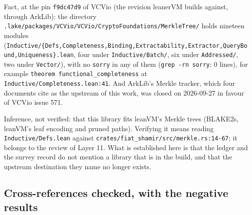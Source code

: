 \begin{sloppypar}
Fact, at the pin \texttt{f9dc47d9} of VCVio (the revision leanerVM builds against, through ArkLib): the directory \texttt{.\allowbreak{}lake/\allowbreak{}packages/\allowbreak{}VCVio/\allowbreak{}VCVio/\allowbreak{}Crypto\allowbreak{}Foundations/\allowbreak{}Merkle\allowbreak{}Tree/\allowbreak{}} holds nineteen modules (\texttt{Inductive/\allowbreak{}\{\allowbreak{}Defs,\allowbreak{}Completeness,\allowbreak{}Binding,\allowbreak{}Extractability,\allowbreak{}Extractor,\allowbreak{}Query\allowbreak{}Bound,\allowbreak{}Uniqueness\}.\allowbreak{}lean}, four under \texttt{Inductive/\allowbreak{}Batch/\allowbreak{}}, six under \texttt{Addressed/\allowbreak{}}, two under \texttt{Vector/\allowbreak{}}), with no \texttt{sorry} in any of them (\texttt{grep -\allowbreak{}rn sorry}: 0 lines), for example \texttt{theorem functional\_\allowbreak{}completeness} at \texttt{Inductive/\allowbreak{}Completeness.\allowbreak{}lean:\allowbreak{}41}. And ArkLib's Merkle tracker, which four documents cite as the upstream of this work, was closed on 2026-09-27 in favour of VCVio issue 571.
\end{sloppypar}

\begin{sloppypar}
Inference, not verified: that this library fits leanVM's Merkle trees (BLAKE2s, leanVM's leaf encoding and pruned paths). Verifying it means reading \texttt{Inductive/\allowbreak{}Defs.\allowbreak{}lean} against \texttt{crates/\allowbreak{}fiat\_\allowbreak{}shamir/\allowbreak{}src/\allowbreak{}merkle.\allowbreak{}rs:\allowbreak{}14-\allowbreak{}67}; it belongs to the review of Layer 11. What is established here is that the ledger and the survey record do not mention a library that is in the build, and that the upstream destination they name no longer exists.
\end{sloppypar}

\subsection{Cross-references checked, with the negative results}\label{sec:docs-crossrefs}

